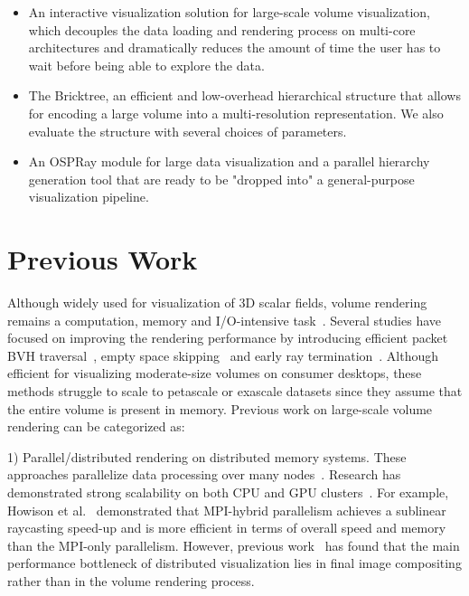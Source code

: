 \begin{itemize}
\item An interactive visualization solution for large-scale volume
visualization, which decouples the data loading and rendering process 
on multi-core architectures and dramatically reduces the amount of time the user has to
wait before being able to explore the data. 
\item The Bricktree, an efficient and low-overhead hierarchical structure that
allows for encoding a large volume into a multi-resolution representation.
We also evaluate the structure with several choices of parameters. 
\item An OSPRay module for large data visualization
and a parallel hierarchy generation tool that are ready to be 
"dropped into" a general-purpose visualization pipeline.  
\end{itemize}



\section{Previous Work}

Although widely used for visualization of 3D scalar fields, volume rendering
remains a computation, memory and I/O-intensive task~\cite{wu2018visit}. 
Several studies have focused on improving the rendering performance by
introducing efficient packet BVH traversal~\cite{knoll2011full,wald2017ospray}, 
empty space skipping~\cite{hadwiger2018sparseleap} and
early ray termination~\cite{levoy1990efficient,kruger2003acceleration}.
Although efficient for visualizing moderate-size volumes on consumer desktops, 
these methods struggle to scale to petascale or exascale datasets since they assume that the entire volume is present in memory. 
Previous work on large-scale volume rendering
can be categorized as: 

1) Parallel/distributed rendering on distributed memory systems. These approaches
parallelize data processing over many nodes~\cite{childs2010extreme}. Research
has demonstrated strong scalability on both CPU and GPU clusters~\cite{childs2006scalable,
howison2012hybrid,peterka2008parallel,eilemann2009equalizer,fogal2010large,beyer2011distributed}. 
For example, Howison et al.~\cite{howison2012hybrid} demonstrated that MPI-hybrid
parallelism achieves a sublinear raycasting speed-up and is more efficient in terms of
overall speed and memory than the MPI-only parallelism.
However, previous work~\cite{wu2018visit} has found that the main
performance bottleneck of distributed visualization lies in final image compositing
rather than in the volume rendering process.

